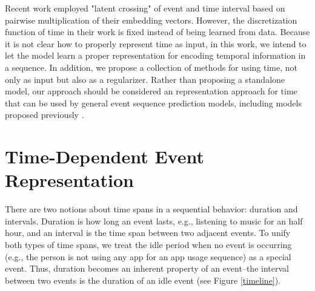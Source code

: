 \documentclass{article} %
\begin{document}
Recent work \citep{46488} employed "latent crossing" of event and time interval based on pairwise multiplication of their embedding vectors. However, the discretization function of time in their work is fixed instead of being learned from data. Because it is not clear how to properly represent time as input, in this work, we intend to let the model learn a proper representation for encoding temporal information in a sequence. In addition, we propose a collection of methods for using time, not only as input but also as a regularizer. Rather than proposing a standalone model, our approach should be considered an representation approach for time that can be used by general event sequence prediction models, including models proposed previously \citep{DuDaiTri16, MeiEis17}. 


\section{Time-Dependent Event Representation}

%
There are two notions about time spans in a sequential behavior: duration and intervals. Duration is how long an event lasts, e.g., listening to music for an half hour, and an interval is the time span between two adjacent events. To unify both types of time spans, we treat the idle period when no event is occurring (e.g., the person is not using any app for an app usage sequence) as a special event. Thus, duration becomes an inherent property of an event--the interval between two events is the duration of an idle event (see Figure \ref{timeline}). 
\end{document}
